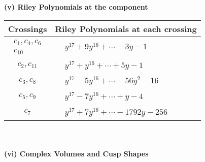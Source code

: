 \documentclass[1p]{elsarticle_modified}
\theoremstyle{definition}
\begin{document}
\flushleft \textbf{(v) Riley Polynomials at the component}\newline \\
\begin{tabular}{m{50pt}|m{274pt}}
Crossings & \hspace{64pt}Riley Polynomials at each crossing \\
\hline $$\begin{aligned}c_{1},c_{4},c_{6}\\c_{10}\end{aligned}$$&$\begin{aligned}
&y^{17}+9 y^{16}+\cdots-3 y-1
\end{aligned}$\\
\hline $$\begin{aligned}c_{2},c_{11}\end{aligned}$$&$\begin{aligned}
&y^{17}+y^{16}+\cdots+5 y-1
\end{aligned}$\\
\hline $$\begin{aligned}c_{3},c_{8}\end{aligned}$$&$\begin{aligned}
&y^{17}-5 y^{16}+\cdots-56 y^2-16
\end{aligned}$\\
\hline $$\begin{aligned}c_{5},c_{9}\end{aligned}$$&$\begin{aligned}
&y^{17}-7 y^{16}+\cdots+y-4
\end{aligned}$\\
\hline $$\begin{aligned}c_{7}\end{aligned}$$&$\begin{aligned}
&y^{17}+7 y^{16}+\cdots-1792 y-256
\end{aligned}$\\
\hline
\end{tabular}\\~\\
\newpage\flushleft \textbf{(vi) Complex Volumes and Cusp Shapes}
\end{document}
